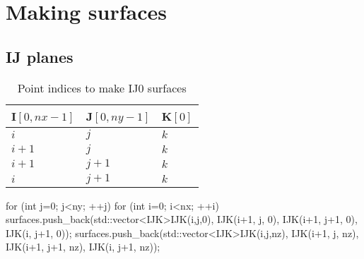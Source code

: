 \documentclass{article}
\begin{document}
\section{Making surfaces}

\subsection{IJ planes}

\begin{table}[H]
\centering
\caption{Point indices to make IJ0 surfaces}
\begin{tabular}{lll}
I$[0,nx-1]$ & J$[0,ny-1]$ & K$[0]$\\
	\midrule
	$i$ & $j$ & $k$\\
	    $i+1$ & $j$ & $k$\\
	    $i+1$ & $j+1$ & $k$\\
	    $i$ & $j+1$ & $k$
	    \end{tabular}
	    \end{table}

    for (int j=0; j<ny; ++j)
    {
        for (int i=0; i<nx; ++i)
        {
            surfaces.push_back(std::vector<IJK>{IJK(i,j,0),  IJK(i+1, j, 0),  IJK(i+1, j+1, 0),  IJK(i, j+1, 0)});
            surfaces.push_back(std::vector<IJK>{IJK(i,j,nz), IJK(i+1, j, nz), IJK(i+1, j+1, nz), IJK(i, j+1, nz)});
        }
    }
\end{document}
